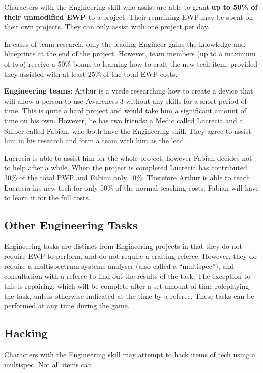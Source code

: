 Characters with the Engineering skill who assist are able to grant \textbf{up to 50\% of their unmodified EWP} to a project. Their remaining EWP may be spent on their own projects. They can only assist with one project per day.

In cases of team research, only the leading Engineer gains the knowledge and blueprints at the end of the project. However, team members (up to a maximum of two) receive a 50\% bonus to learning how to craft the new tech item, provided they assisted with at least 25\% of the total EWP costs.

\textbf{Engineering teams}: Arthur is a vrede researching how to create a device that will allow a person to use Awareness 3 without any skills for a short period of time. This is quite a hard project and would take him a significant amount of time on his own. However, he has two friends: a Medic called Lucrecia and a Sniper called Fabian, who both have the Engineering skill. They agree to assist him in his research and form a team with him as the lead.

Lucrecia is able to assist him for the whole project, however Fabian decides not to help after a while. When the project is completed Lucrecia has contributed 30\% of the total PWP and Fabian only 10\%. Therefore Arthur is able to teach Lucrecia his new tech for only 50\% of the normal teaching costs. Fabian will have to learn it for the full costs.

\subsection{Other Engineering Tasks}

Engineering tasks are distinct from Engineering projects in that they do not require EWP to perform, and do not require a crafting referee. However, they do require a multispectrum systems analyser (also called a ``multispec''), and consultation with a referee to find out the results of the task. The exception to this is repairing, which will be complete after a set amount of time roleplaying the task, unless otherwise indicated at the time by a referee. These tasks can be performed at any time during the game.

\subsection{Hacking}

Characters with the Engineering skill may attempt to hack items of tech using a multispec. Not all items can

